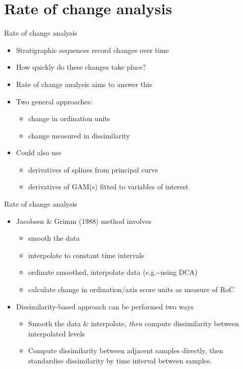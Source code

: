 \documentclass[10pt,ignorenonframetext,compress, aspectratio=169]{beamer}
\providecommand{\tightlist}{%
  \setlength{\itemsep}{0pt}\setlength{\parskip}{0pt}}
\begin{document}
\section{Rate of change analysis}\label{rate-of-change-analysis-3}

\begin{frame}{Rate of change analysis}

\begin{itemize}
\tightlist
\item
  Stratigraphic sequences record changes over time
\item
  How quickly do these changes take place?
\item
  Rate of change analysis aims to answer this
\item
  Two general approaches:

  \begin{itemize}
  \tightlist
  \item
    change in ordination units
  \item
    change measured in dissimilarity
  \end{itemize}
\item
  Could also use

  \begin{itemize}
  \tightlist
  \item
    derivatives of splines from principal curve
  \item
    derivatives of GAM(s) fitted to variables of interest
  \end{itemize}
\end{itemize}

\end{frame}

\begin{frame}{Rate of change analysis}

\begin{itemize}
\tightlist
\item
  Jacobsen \& Grimm (1988) method involves

  \begin{itemize}
  \tightlist
  \item
    smooth the data
  \item
    interpolate to constant time intervals
  \item
    ordinate smoothed, interpolate data (e.g.\textasciitilde{}using DCA)
  \item
    calculate change in ordination/axis score units as measure of RoC
  \end{itemize}
\item
  Dissimilarity-based approach can be performed two ways

  \begin{itemize}
  \tightlist
  \item
    Smooth the data \& interpolate, \emph{then} compute dissimilarity
    between interpolated levels
  \item
    Compute dissimilarity between adjacent samples directly, then
    standardise dissimilarity by time interval between samples.
  \end{itemize}
\end{itemize}

\end{frame}
\end{document}
